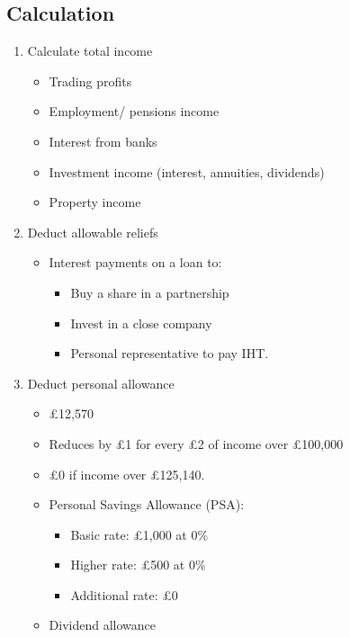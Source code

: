 \documentclass[
]{article}
\providecommand{\tightlist}{%
  \setlength{\itemsep}{0pt}\setlength{\parskip}{0pt}}
\begin{document}
\hypertarget{calculation}{%
\subsection{Calculation}\label{calculation}}

\begin{enumerate}
\def\labelenumi{\arabic{enumi}.}
\tightlist
\item
  Calculate total income

  \begin{itemize}
  \tightlist
  \item
    Trading profits
  \item
    Employment/ pensions income
  \item
    Interest from banks
  \item
    Investment income (interest, annuities, dividends)
  \item
    Property income
  \end{itemize}
\item
  Deduct allowable reliefs

  \begin{itemize}
  \tightlist
  \item
    Interest payments on a loan to:

    \begin{itemize}
    \tightlist
    \item
      Buy a share in a partnership
    \item
      Invest in a close company
    \item
      Personal representative to pay IHT.
    \end{itemize}
  \end{itemize}
\item
  Deduct personal allowance

  \begin{itemize}
  \tightlist
  \item
    £12,570
  \item
    Reduces by £1 for every £2 of income over £100,000
  \item
    £0 if income over £125,140.
  \item
    Personal Savings Allowance (PSA):

    \begin{itemize}
    \tightlist
    \item
      Basic rate: £1,000 at 0\%
    \item
      Higher rate: £500 at 0\%
    \item
      Additional rate: £0
    \end{itemize}
  \item
    Dividend allowance


\end{itemize}
\end{enumerate}
\end{document}
